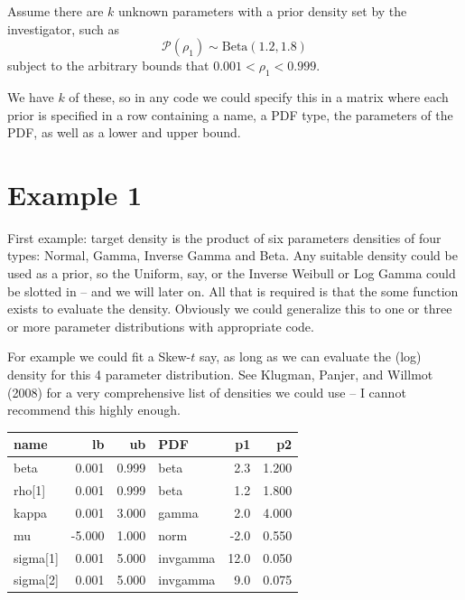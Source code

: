 \documentclass[
  letterpaper,
]{book}
\begin{document}
Assume there are \(k\) unknown parameters with a prior density set by
the investigator, such as \begin{equation}
  \mathcal{P}(\rho_1) \sim \text{Beta}(1.2,1.8)
\end{equation} subject to the arbitrary bounds that
\(0.001 < \rho_1 <0.999\).

We have \(k\) of these, so in any code we could specify this in a matrix
where each prior is specified in a row containing a name, a PDF type,
the parameters of the PDF, as well as a lower and upper bound.

\hypertarget{example-1}{%
\section{Example 1}\label{example-1}}

First example: target density is the product of six parameters densities
of four types: Normal, Gamma, Inverse Gamma and Beta. Any suitable
density could be used as a prior, so the Uniform, say, or the Inverse
Weibull or Log Gamma could be slotted in -- and we will later on. All
that is required is that the some function exists to evaluate the
density. Obviously we could generalize this to one or three or more
parameter distributions with appropriate code.

For example we could fit a Skew-\(t\) say, as long as we can evaluate
the (log) density for this 4 parameter distribution. See Klugman,
Panjer, and Willmot (2008) for a very comprehensive list of densities we
could use -- I cannot recommend this highly enough.

\begin{table}
\centering
\begin{tabular}{l|r|r|l|r|r}
\hline
name & lb & ub & PDF & p1 & p2\\
\hline
beta & 0.001 & 0.999 & beta & 2.3 & 1.200\\
\hline
rho[1] & 0.001 & 0.999 & beta & 1.2 & 1.800\\
\hline
kappa & 0.001 & 3.000 & gamma & 2.0 & 4.000\\
\hline
mu & -5.000 & 1.000 & norm & -2.0 & 0.550\\
\hline
sigma[1] & 0.001 & 5.000 & invgamma & 12.0 & 0.050\\
\hline
sigma[2] & 0.001 & 5.000 & invgamma & 9.0 & 0.075\\
\hline
\end{tabular}
\end{table}
\end{document}
